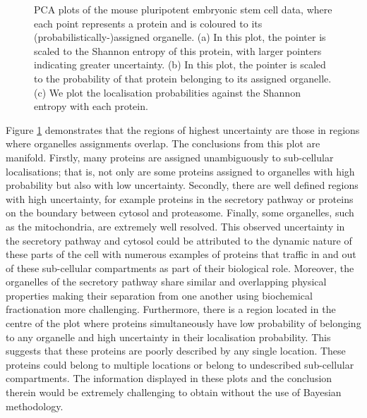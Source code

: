 \documentclass[12pt,english]{article}\usepackage[]{graphicx}\usepackage[]{color}
\newenvironment{knitrout}{}{} %
\begin{document}
\begin{figure}[h]
\begin{subfigure}[t]{0.5\textwidth}
\begin{knitrout}
{}



\end{knitrout}
    \caption{}
  \end{subfigure}

  \caption{PCA plots of the mouse pluripotent embryonic stem cell data, where
    each point represents a protein and is coloured
    to its (probabilistically-)assigned organelle. (a) In this plot, the pointer is
    scaled to the Shannon entropy of this protein, with
    larger pointers indicating greater uncertainty.
    (b) In this plot, the pointer is scaled to the probability
    of that protein belonging to its assigned organelle. (c) We plot
    the localisation probabilities against the Shannon entropy
    with each protein.}
  \label{figure:proteomeuncertainty}
 \end{figure}

 Figure \ref{figure:proteomeuncertainty} demonstrates that the regions
 of highest uncertainty are those in regions where organelles
 assignments overlap. The conclusions from this plot are
 manifold. Firstly, many proteins are assigned unambiguously to
 sub-cellular localisations; that is, not only are some proteins
 assigned to organelles with high probability but also with low
 uncertainty. Secondly, there are well defined regions with high
 uncertainty, for example proteins in the secretory pathway or
 proteins on the boundary between cytosol and proteasome. Finally,
 some organelles, such as the mitochondria, are extremely well
 resolved. This observed uncertainty in the secretory pathway and
 cytosol could be attributed to the dynamic nature of these parts of
 the cell with numerous examples of proteins that traffic in and out
 of these sub-cellular compartments as part of their biological
 role. Moreover, the organelles of the secretory pathway share similar
 and overlapping physical properties making their separation from one
 another using biochemical fractionation more challenging.
 Furthermore, there is a region located in the centre of the plot
 where proteins simultaneously have low probability of belonging to
 any organelle and high uncertainty in their localisation probability.
 This suggests that these proteins are poorly described by any single
 location. These proteins could belong to multiple locations or belong
 to undescribed sub-cellular compartments. The information displayed
 in these plots and the conclusion therein would be extremely
 challenging to obtain without the use of Bayesian methodology.
\end{document}
